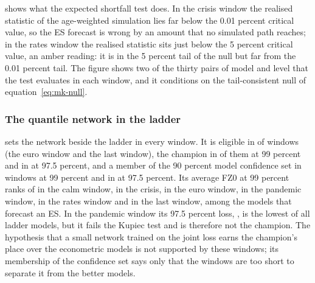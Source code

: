  shows what the expected shortfall test does. In the crisis window the realised statistic of the age-weighted simulation lies far below the 0.01 percent critical value, so the ES forecast is wrong by an amount that no
simulated path reaches; in the rates window the realised statistic sits just below the 5 percent critical value, an amber reading: it is in the 5 percent tail of the null but far from the 0.01 percent tail. The figure shows two of
the thirty pairs of model and level that the test evaluates in each window, and it conditions on the tail-consistent null of equation~\eqref{eq:mk-null}.

\subsubsection{The quantile network in the ladder}
 sets the network beside the ladder in every window. It is eligible in \mkNnEligWindows{} of \mkNWindows{} windows (the euro window and the last window), the champion in \mkNnChampA{} of them at 99 percent and in \mkNnChampB{} at 97.5 percent, and a member of the 90
percent model confidence set in \mkNnSetA{} windows at 99 percent and in \mkNnSetB{} at 97.5 percent. Its average FZ0 at 99 percent ranks \mkNnRankCalm{} of \mkNRankCalm{} in the calm window, \mkNnRankGfc{} in the crisis, \mkNnRankFx{} in the euro window, \mkNnRankCovid{} in the pandemic window,
\mkNnRankRates{} in the rates window and \mkNnRankMixed{} in the last window, among the models that forecast an ES. In the pandemic window its 97.5 percent loss, \mkNnFzBCovid{}, is the lowest of all ladder models, but it fails the Kupiec test and is
therefore not the champion. The hypothesis that a small network trained on the joint loss earns the champion's place over the econometric models is not supported by these windows; its membership of the confidence set says only that the windows
are too short to separate it from the better models.




